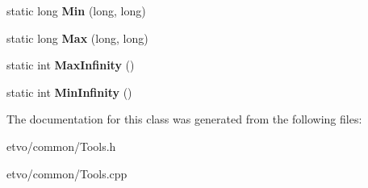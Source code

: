 \begin{DoxyCompactItemize}
static long {\bfseries Min} (long, long)
\item 
\mbox{\label{classetvo_i_i_1_1_tools_a5831d2c7887faff6fcf529fea63b1070}} 
static long {\bfseries Max} (long, long)
\item 
\mbox{\label{classetvo_i_i_1_1_tools_a86622ed2e0b78773cb68be4df51312fe}} 
static int {\bfseries Max\+Infinity} ()
\item 
\mbox{\label{classetvo_i_i_1_1_tools_a207bb06f93ffbd5a8ecb0dbd07e94a0e}} 
static int {\bfseries Min\+Infinity} ()
\end{DoxyCompactItemize}


The documentation for this class was generated from the following files\+:\begin{DoxyCompactItemize}
\item 
etvo/common/Tools.\+h\item 
etvo/common/Tools.\+cpp\end{DoxyCompactItemize}
